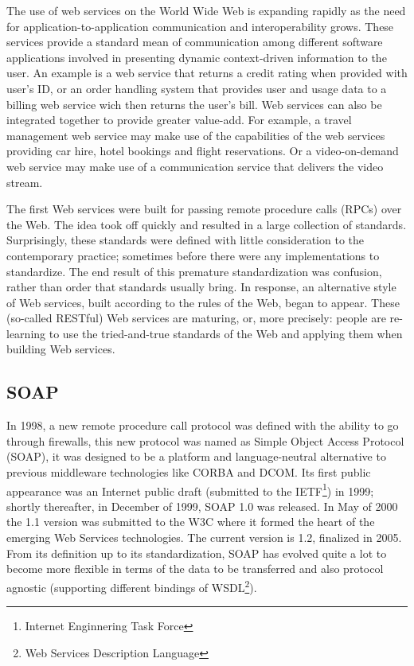 The use of web services on the World Wide Web is expanding rapidly as the need for application-to-application communication and interoperability grows. These services provide a standard mean of communication among different software applications involved in presenting dynamic context-driven information to the user\cite{Austin:2004}. An example is a web service that returns a credit rating when provided with user's ID, or an order handling system that provides user and usage data to a billing web service wich then returns the user's bill. Web services can also be integrated together to provide greater value-add. For example, a travel management web service may make use of the capabilities of the web services providing car hire, hotel bookings and flight reservations. Or a video-on-demand web service may make use of a communication service that delivers the video stream.

The first Web services were built for passing remote procedure calls (RPCs) over the Web. The idea took off quickly and resulted in a large collection of standards. Surprisingly, these standards were defined with little consideration to the contemporary practice; sometimes before there were any implementations to standardize. The end result of this premature standardization was confusion, rather than order that standards usually bring. In response, an alternative style of Web services, built according to the rules of the Web, began to appear. These (so-called RESTful) Web services are maturing, or, more precisely: people are re-learning to use the tried-and-true standards of the Web and applying them when building Web services.

\subsection{SOAP}
In 1998, a new remote procedure call protocol was defined with the ability to go through firewalls, this new protocol was named as Simple Object Access Protocol (SOAP), it was designed to be a platform and language-neutral alternative to previous middleware technologies like CORBA and DCOM. Its first public appearance was an Internet public draft (submitted to the IETF\footnote{Internet Enginnering Task Force}) in 1999; shortly thereafter, in December of 1999, SOAP 1.0 was released. In May of 2000 the 1.1 version was submitted to the W3C where it formed the heart of the emerging Web Services technologies. The current version is 1.2, finalized in 2005. From its definition up to its standardization, SOAP has evolved quite a lot to become more flexible in terms of the data to be transferred and also protocol agnostic (supporting different bindings of WSDL\footnote{Web Services Description Language})\cite{Pautasso:2007}.

